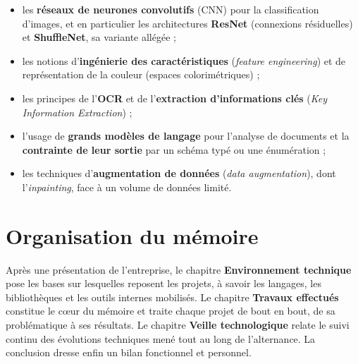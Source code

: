 \begin{itemize}
  \item les \textbf{réseaux de neurones convolutifs} (CNN) pour la classification
        d'images, et en particulier les architectures \textbf{ResNet} (connexions
        résiduelles) et \textbf{ShuffleNet}, sa variante allégée ;
  \item les notions d'\textbf{ingénierie des caractéristiques} (\emph{feature
        engineering}) et de représentation de la couleur (espaces colorimétriques) ;
  \item les principes de l'\textbf{OCR} et de l'\textbf{extraction d'informations
        clés} (\emph{Key Information Extraction}) ;
  \item l'usage de \textbf{grands modèles de langage} pour l'analyse de documents et
        la \textbf{contrainte de leur sortie} par un schéma typé ou une énumération ;
  \item les techniques d'\textbf{augmentation de données} (\emph{data augmentation}),
        dont l'\emph{inpainting}, face à un volume de données limité.
\end{itemize}

\section*{Organisation du mémoire}

Après une présentation de l'entreprise, le chapitre \textbf{Environnement technique}
pose les bases sur lesquelles reposent les projets, à savoir les langages, les
bibliothèques et les outils internes mobilisés. Le chapitre \textbf{Travaux
effectués} constitue le cœur du mémoire et traite chaque projet de bout en bout, de
sa problématique à ses résultats. Le chapitre \textbf{Veille technologique} relate le
suivi continu des évolutions techniques mené tout au long de l'alternance. La
conclusion dresse enfin un bilan fonctionnel et personnel.
